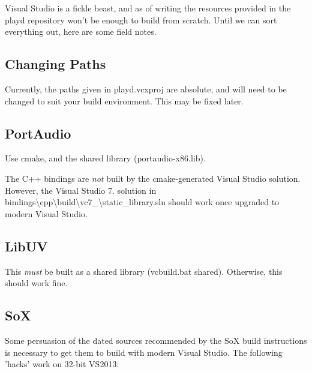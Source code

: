 Visual Studio is a fickle beast, and as of writing the resources provided in the playd repository won't be enough to build from scratch. Until we can sort everything out, here are some field notes.

\subsection*{Changing Paths}

Currently, the paths given in {\ttfamily playd.\+vcxproj} are absolute, and will need to be changed to suit your build environment. This may be fixed later.

\subsection*{Port\+Audio}

Use cmake, and the shared library ({\ttfamily portaudio-\/x86.\+lib}).

The C++ bindings are {\itshape not} built by the cmake-\/generated Visual Studio solution. However, the Visual Studio 7. solution in {\ttfamily bindings\textbackslash{}cpp\textbackslash{}build\textbackslash{}vc7\+\_\textbackslash{}static\+\_\+library.\+sln} should work once upgraded to modern Visual Studio.

\subsection*{Lib\+U\+V}

This {\itshape must} be built as a shared library ({\ttfamily vcbuild.\+bat shared}). Otherwise, this should work fine.

\subsection*{So\+X}

Some persuasion of the dated sources recommended by the So\+X build instructions is necessary to get them to build with modern Visual Studio. The following 'hacks' work on 32-\/bit V\+S2013\+:


